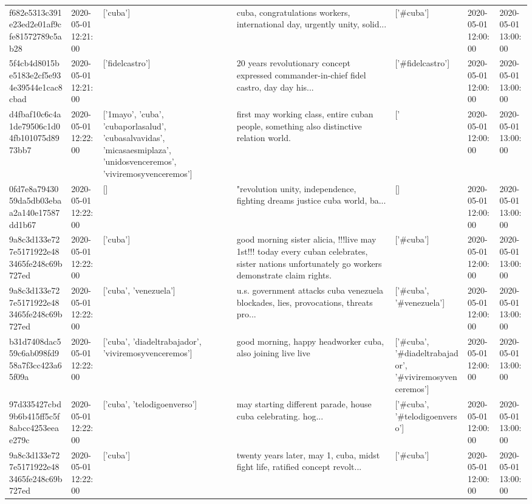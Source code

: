\begin{tabular}{lllllll}
f682e5313c391e23ed2e01af9cfe81572789c5ab28 & 2020-05-01 12:21:00 & ['cuba'] & cuba, congratulations workers, international day, urgently unity, solid... & ['#cuba'] & 2020-05-01 12:00:00 & 2020-05-01 13:00:00 \\
5f4cb4d8015be5183e2cf5e934e39544e1cac8cbad & 2020-05-01 12:21:00 & ['fidelcastro'] & 20 years revolutionary concept expressed commander-in-chief fidel castro, day day his... & ['#fidelcastro'] & 2020-05-01 12:00:00 & 2020-05-01 13:00:00 \\
d4fbaf10c6c4a1de79506c1d04fb101075d8973bb7 & 2020-05-01 12:22:00 & ['1mayo', 'cuba', 'cubaporlasalud', 'cubasalvavidas', 'micasaesmiplaza', 'unidosvenceremos', 'viviremosyvenceremos'] & first may working class, entire cuban people, something also distinctive relation world. & ['#1mayo', '#cuba', '#cubaporlasalud', '#cubasalvavidas', '#micasaesmiplaza', '#unidosvenceremos', '#viviremosyvenceremos'] & 2020-05-01 12:00:00 & 2020-05-01 13:00:00 \\
0fd7e8a7943059da5db03ebaa2a140e17587dd1b67 & 2020-05-01 12:22:00 & [] & "revolution unity, independence, fighting dreams justice cuba world, ba... & [] & 2020-05-01 12:00:00 & 2020-05-01 13:00:00 \\
9a8c3d133e727e5171922e483465fe248c69b727ed & 2020-05-01 12:22:00 & ['cuba'] & good morning sister alicia, !!!live may 1st!!! today every cuban celebrates, sister nations unfortunately go workers demonstrate claim rights. & ['#cuba'] & 2020-05-01 12:00:00 & 2020-05-01 13:00:00 \\
9a8c3d133e727e5171922e483465fe248c69b727ed & 2020-05-01 12:22:00 & ['cuba', 'venezuela'] & u.s. government attacks cuba venezuela blockades, lies, provocations, threats pro... & ['#cuba', '#venezuela'] & 2020-05-01 12:00:00 & 2020-05-01 13:00:00 \\
b31d7408dac559c6ab098fd958a7f3cc423a65f09a & 2020-05-01 12:22:00 & ['cuba', 'diadeltrabajador', 'viviremosyvenceremos'] & good morning, happy headworker cuba, also joining live live & ['#cuba', '#diadeltrabajador', '#viviremosyvenceremos'] & 2020-05-01 12:00:00 & 2020-05-01 13:00:00 \\
97d335427cbd9b6b415ff5c5f8abcc4253eeae279c & 2020-05-01 12:22:00 & ['cuba', 'telodigoenverso'] & may starting different parade, house cuba celebrating. hog... & ['#cuba', '#telodigoenverso'] & 2020-05-01 12:00:00 & 2020-05-01 13:00:00 \\
9a8c3d133e727e5171922e483465fe248c69b727ed & 2020-05-01 12:22:00 & ['cuba'] & twenty years later, may 1, cuba, midst fight life, ratified concept revolt... & ['#cuba'] & 2020-05-01 12:00:00 & 2020-05-01 13:00:00 \\

\end{tabular}
